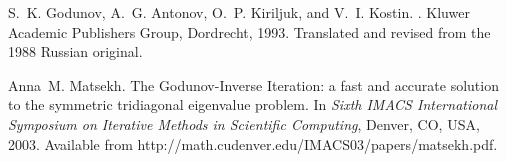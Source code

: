 \documentclass{report}
\begin{document}
\begin{thebibliography}{GAKK93}

S.~K. Godunov, A.~G. Antonov, O.~P. Kiriljuk, and V.~I. Kostin.
.
\newblock Kluwer Academic Publishers Group, Dordrecht, 1993.
\newblock Translated and revised from the 1988 Russian original.

Anna~M. Matsekh.
\newblock The {G}odunov-Inverse Iteration: {a} fast and accurate solution to
the symmetric tridiagonal eigenvalue problem.
\newblock In {\em Sixth IMACS International Symposium on Iterative
Methods in Scientific Computing}, Denver, CO, USA, 2003.
\newblock Available from http://math.cudenver.edu/IMACS03/papers/matsekh.pdf.

\end{thebibliography}
\end{document}
